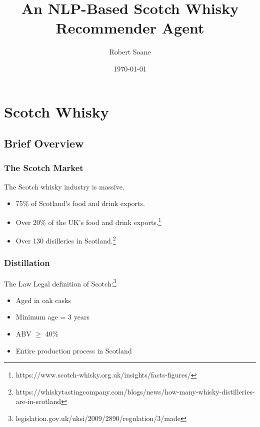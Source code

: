 \documentclass{beamer}
\title[Scotch Recommender]{An NLP-Based Scotch Whisky Recommender Agent} %
\author{Robert Soane} %
\institute[] %
{
 \\ %
\medskip
}
\date{\today} %
\begin{document}
\begin{frame}
\titlepage %
\end{frame}


\section{Scotch Whisky} 

\subsection{Brief Overview} %

\begin{frame}
\frametitle{The Scotch Market}
The Scotch whisky industry is massive.
\begin{itemize}
    \item 75\% of Scotland's food and drink exports.
    \item Over 20\% of the UK's food and drink exports.\footnote{https://www.scotch-whisky.org.uk/insights/facts-figures/}
    \item Over 130 disilleries in Scotland.\footnote{https://whiskytastingcompany.com/blogs/news/how-many-whisky-distilleries-are-in-scotland}
\end{itemize}

\end{frame}

\begin{frame}
    \frametitle{Distillation}
    \begin{block}{The Law}
        Legal definition of Scotch:\footnote{legislation.gov.uk/uksi/2009/2890/regulation/3/made}
        \begin{itemize}
            \item Aged in oak casks
            \item Minimum age = 3 years
            \item ABV $\geq$ 40\%
            \item Entire production process in Scotland
        \end{itemize}
        
    \end{block}
\end{frame}
\end{document}
